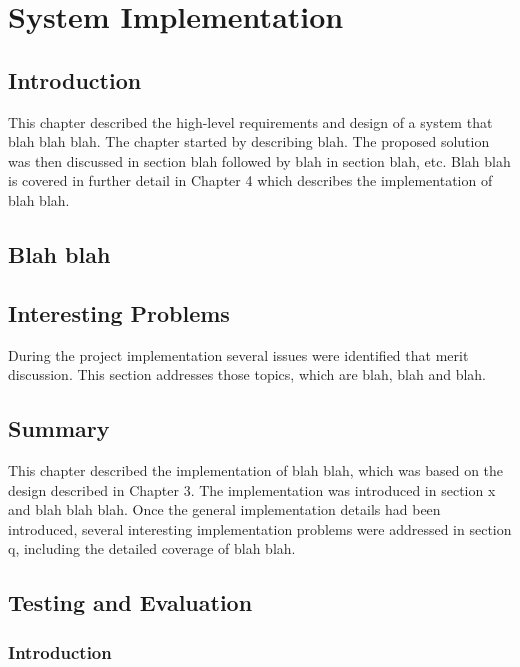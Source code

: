 \chapter{System Implementation}

\section{Introduction} \label{s-i--introduction}

This chapter described the high-level requirements and design of a system that blah blah blah.  The chapter started by describing blah.  The proposed solution was then discussed in section blah followed by blah in section blah, etc.
Blah blah is covered in further detail in Chapter 4 which describes the implementation of blah blah.

\section{Blah blah}

\section{Interesting Problems} \label{s-i--interesting-problems}

During the project implementation several issues were identified that merit discussion. This section addresses those topics, which are blah, blah and blah.

\section{Summary} \label{s-i--summary}

This chapter described the implementation of blah blah, which was based on the design described in Chapter 3. The implementation was introduced in section x and blah blah blah. Once the general implementation details had been introduced, several interesting implementation problems were addressed in section q, including the detailed coverage of blah blah.

\section{Testing and Evaluation} \label{s-i--testing-and-evaluation}

\subsection{Introduction}

